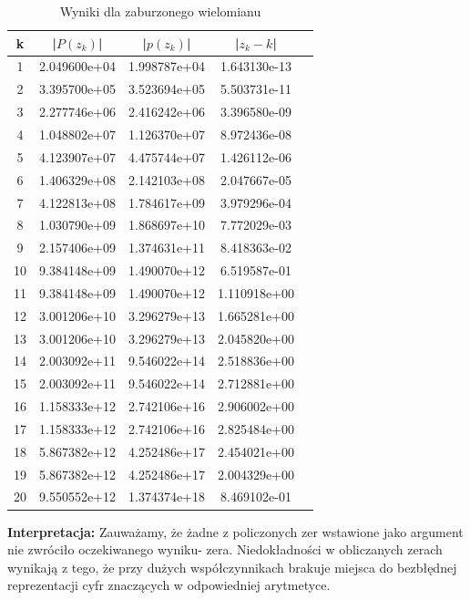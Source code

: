 \documentclass[a4paper,14pt]{report}
\begin{document}
    \begin{table}[H]
    \centering
    \begin{tabular}{|c | c | c | c | c |} 
     \hline
     k & |$P(z_{k})$| & |$p(z_{k})$| & |$z_{k}-k$| \\ [0.5ex]
     \hline\hline
     1 & 2.049600e+04 & 1.998787e+04 & 1.643130e-13 \\
     2 & 3.395700e+05 & 3.523694e+05 & 5.503731e-11 \\
     3 & 2.277746e+06 & 2.416242e+06 & 3.396580e-09 \\
     4 & 1.048802e+07 & 1.126370e+07 & 8.972436e-08 \\
     5 & 4.123907e+07 & 4.475744e+07 & 1.426112e-06 \\
     6 & 1.406329e+08 & 2.142103e+08 & 2.047667e-05 \\
     7 & 4.122813e+08 & 1.784617e+09 & 3.979296e-04 \\
     8 & 1.030790e+09 & 1.868697e+10 & 7.772029e-03 \\
     9 & 2.157406e+09 & 1.374631e+11 & 8.418363e-02 \\
     10 & 9.384148e+09 & 1.490070e+12 & 6.519587e-01 \\
     11 & 9.384148e+09 & 1.490070e+12 & 1.110918e+00 \\
     12 & 3.001206e+10 & 3.296279e+13 & 1.665281e+00 \\
     13 & 3.001206e+10 & 3.296279e+13 & 2.045820e+00 \\
     14 & 2.003092e+11 & 9.546022e+14 & 2.518836e+00 \\
     15 & 2.003092e+11 & 9.546022e+14 & 2.712881e+00 \\
     16 & 1.158333e+12 & 2.742106e+16 & 2.906002e+00 \\
     17 & 1.158333e+12 & 2.742106e+16 & 2.825484e+00 \\
     18 & 5.867382e+12 & 4.252486e+17 & 2.454021e+00 \\
     19 & 5.867382e+12 & 4.252486e+17 & 2.004329e+00 \\
     20 & 9.550552e+12 & 1.374374e+18 & 8.469102e-01 \\
     \hline
    \end{tabular}
    \caption{Wyniki dla zaburzonego wielomianu}
    \label{Zad4WielomianB}
    \end{table}
    \textbf{Interpretacja:} Zauważamy, że żadne z policzonych zer wstawione jako argument nie zwróciło oczekiwanego wyniku- zera.
    Niedokładności w obliczanych zerach wynikają z tego, że przy dużych współczynnikach brakuje miejsca do bezbłędnej reprezentacji cyfr znaczących w odpowiedniej arytmetyce.
\end{document}
